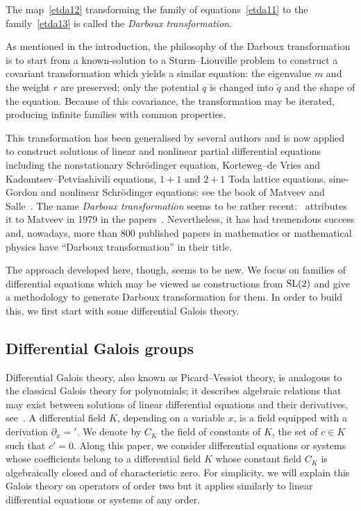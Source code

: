 \documentclass[10pt,a4paper]{amsart}
\numberwithin{equation}{section}
\begin{document}
\begin{Definition}
The map~\eqref{etda12} transforming the family of equations~\eqref{etda11} to the family~\eqref{etda13} is called the \emph{Darboux transformation}. %
\end{Definition}

As mentioned in the introduction, the philosophy of the Darboux transformation is to start from a known-solution to a Sturm--Liouville problem to construct a covariant transformation which yields a similar equation: the eigenvalue $m$ and the weight $r$ are preserved; only the potential $q$ is changed into $\tilde{q}$ and the shape of the equation. Because of this covariance, the transformation may be iterated, producing infinite families with common properties.

This transformation has been generalised by several authors and is now applied to construct solutions of linear and nonlinear partial differential equations including the nonstationary Schr\"odinger equation, Korteweg--de Vries and Kadomtsev--Petviashivili equations, $1 + 1$ and $2+1$ Toda lattice equations,
sine-Gordon and nonlinear Schr\"odinger equations: see the book of Matveev and Salle~\cite{MaSa91a}. The name \emph{Darboux transformation} seems to be rather recent:~\cite{rosu1999short} attributes it to Matveev in 1979 in the papers~\cite{Ma79u,Ma79m,MaSa79a}. Nevertheless, it has had tremendous success and, nowadays, more than 800 published papers in mathematics or mathematical physics have ``Darboux transformation'' in their title.

The approach developed here, though, seems to be new. We focus on families of differential equations which may be viewed as constructions from ${\rm SL}(2)$ and give a methodology to generate Darboux transformation for them. In order to build this, we first start with some differential Galois theory.

\subsection{Differential Galois groups} \label{dgal-section}
Differential Galois theory, also known as Picard--Vessiot theory, is analogous to the classical Galois theory for polynomials; it describes algebraic relations that may exist between solutions of linear differential equations and their derivatives,
see~\cite{crhamo,PS}.
A differential field $K$, depending on a variable $x$, is a field equipped with a derivation $\partial_x={}'$. We denote by $C_K$ the field of constants of $K$, the set of $c\in K$ such that $c'=0$. Along this
paper, we consider differential equations or systems whose coefficients belong
to a differential field $K$ whose constant field $C_K$ is algebraically closed and of characteristic zero.
For simplicity, we will explain this Galois theory on operators of order two but it applies similarly to linear differential equations or systems of any order.
\end{document}
